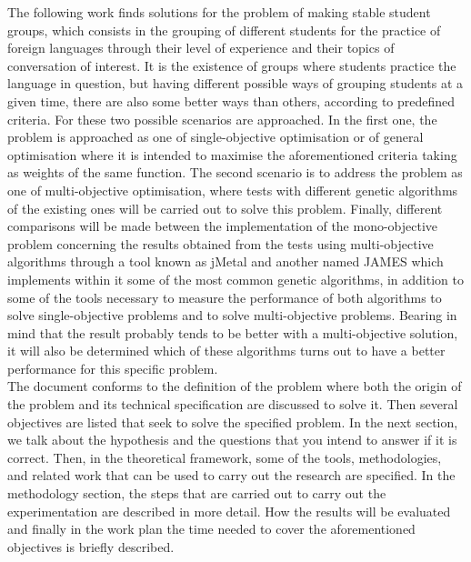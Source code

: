 The following work finds solutions for the problem of making stable student groups, which consists in the grouping of different students for the practice of foreign languages through their level of experience and their topics of conversation of interest. It is the existence of groups where students practice the language in question, but having different possible ways of grouping students at a given time, there are also some better ways than others, according to predefined criteria. For these two possible scenarios are approached. In the first one, the problem is approached as one of single-objective optimisation or of general optimisation where it is intended to maximise the aforementioned criteria taking as weights of the same function. The second scenario is to address the problem as one of multi-objective optimisation, where tests with different genetic algorithms of the existing ones will be carried out to solve this problem. Finally, different comparisons will be made between the implementation of the mono-objective problem concerning the results obtained from the tests using multi-objective algorithms through a tool known as jMetal and another named JAMES which implements within it some of the most common genetic algorithms, in addition to some of the tools necessary to measure the performance of both algorithms to solve single-objective problems and to solve multi-objective problems. Bearing in mind that the result probably tends to be better with a multi-objective solution, it will also be determined which of these algorithms turns out to have a better performance for this specific problem.\\

The document conforms to the definition of the problem where both the origin of the problem and its technical specification are discussed to solve it. Then several objectives are listed that seek to solve the specified problem. In the next section, we talk about the hypothesis and the questions that you intend to answer if it is correct. Then, in the theoretical framework, some of the tools, methodologies, and related work that can be used to carry out the research are specified. In the methodology section, the steps that are carried out to carry out the experimentation are described in more detail. How the results will be evaluated and finally in the work plan the time needed to cover the aforementioned objectives is briefly described.